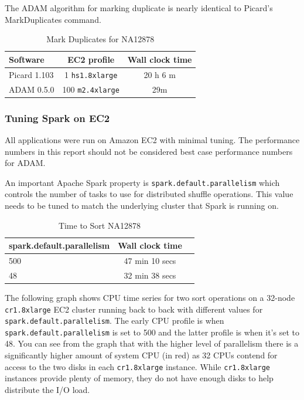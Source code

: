 \documentclass[10pt,twocolumn]{article}
\theoremstyle{plain}
\begin{document}
The ADAM algorithm for marking duplicate is nearly identical to Picard's MarkDuplicates
command. 

\begin{table}[h]
\caption{Mark Duplicates for NA12878}
\label{tab:time-mark-duplicates}
\begin{scriptsize}
\begin{center}
\begin{tabular}{| l | c | c |}
\hline
\bf Software & \bf EC2 profile & \bf Wall clock time \\
\hline
Picard 1.103 & 1 \texttt{hs1.8xlarge} & 20 h 6 m \\
ADAM 0.5.0 & 100 \texttt{m2.4xlarge} & 29m \\
\hline
\end{tabular}
\end{center}
\end{scriptsize}
\end{table}

\subsubsection{Tuning Spark on EC2}

All applications were run on Amazon EC2 with minimal tuning. The performance numbers in this report
should not be considered best case performance numbers for ADAM.

An important Apache Spark property is \texttt{spark.default.parallelism} which controls the number
of tasks to use for distributed shuffle operations. This value needs to be tuned to match the
underlying cluster that Spark is running on.

\begin{table}[h]
\caption{Time to Sort NA12878}
\label{tab:time-sort-parallelism}
\begin{center}
\begin{tabular}{| l | c | c |}
\hline
\bf \small{spark.default.parallelism} & \bf Wall clock time \\
\hline
500 & 47 min 10 secs \\
48 & 32 min 38 secs \\ 
\hline
\end{tabular}
\end{center}
\end{table}

The following graph shows CPU time series for two sort operations on a 32-node \texttt{cr1.8xlarge}
EC2 cluster running back to back with different values for \texttt{spark.default.parallelism}.
The early CPU profile is when \texttt{spark.default.parallelism} is set to 500 and the latter profile
is when it's set to 48. You can see from the graph that with the higher level of parallelism
there is a significantly higher amount of system CPU (in red) as 32 CPUs contend for access to 
the two disks in each \texttt{cr1.8xlarge} instance. While \texttt{cr1.8xlarge} instances provide
plenty of memory, they do not have enough disks to help distribute the I/O load.
\end{document}

